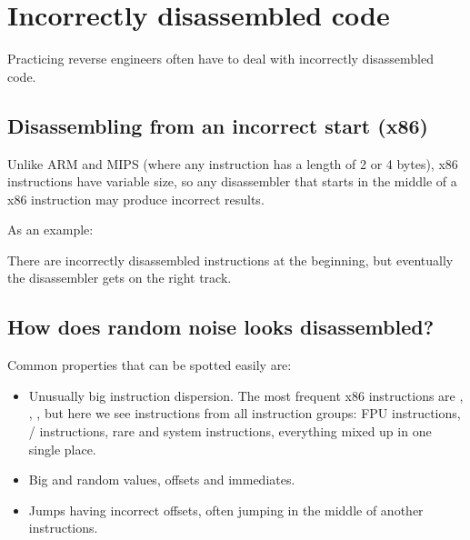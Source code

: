 \section{Incorrectly disassembled code}
\label{sec:incorrectly_disasmed_code}

Practicing reverse engineers often have to deal with incorrectly disassembled code.

\subsection{Disassembling from an incorrect start (x86)}

Unlike ARM and MIPS (where any instruction has a length of 2 or 4 bytes), x86 instructions have variable size,
so any disassembler that starts in the middle of a x86 instruction may produce incorrect results.

As an example:



There are incorrectly disassembled instructions at the beginning, but eventually the disassembler gets on the right 
track.

\subsection{How does random noise looks disassembled?}

Common properties that can be spotted easily are:

\begin{itemize}
\item Unusually big instruction dispersion.
The most frequent x86 instructions are \PUSH{}, \MOV{}, \CALL{}, 
but here we see
instructions from all instruction groups: \ac{FPU} instructions, / instructions, rare and system instructions,
everything mixed up in one single place.

\item Big and random values, offsets and immediates.

\item Jumps having incorrect offsets, often jumping in the middle of another instructions.
\end{itemize}



